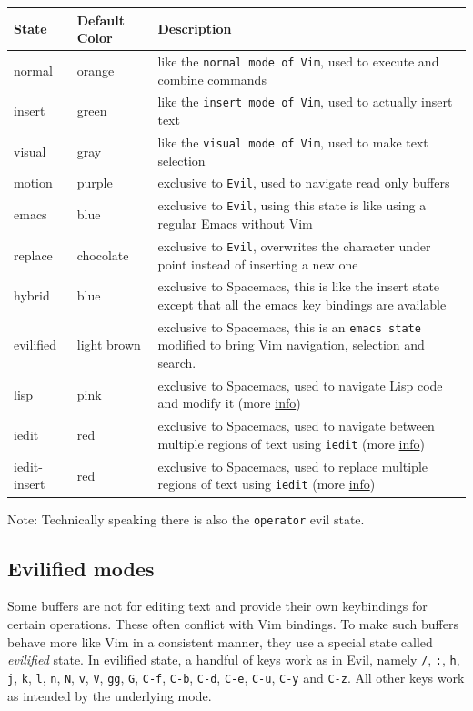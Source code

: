 \documentclass[11pt]{article}
\begin{document}
\begin{center}
\begin{tabular}{lll}
State & Default Color & Description\\
\hline
normal & orange & like the \texttt{normal mode of Vim}, used to execute and combine commands\\
insert & green & like the \texttt{insert mode of Vim}, used to actually insert text\\
visual & gray & like the \texttt{visual mode of Vim}, used to make text selection\\
motion & purple & exclusive to \texttt{Evil}, used to navigate read only buffers\\
emacs & blue & exclusive to \texttt{Evil}, using this state is like using a regular Emacs without Vim\\
replace & chocolate & exclusive to \texttt{Evil}, overwrites the character under point instead of inserting a new one\\
hybrid & blue & exclusive to Spacemacs, this is like the insert state except that all the emacs key bindings are available\\
evilified & light brown & exclusive to Spacemacs, this is an \texttt{emacs state} modified to bring Vim navigation, selection and search.\\
lisp & pink & exclusive to Spacemacs, used to navigate Lisp code and modify it (more \hyperref[sec:org3895a0c]{info})\\
iedit & red & exclusive to Spacemacs, used to navigate between multiple regions of text using \texttt{iedit} (more \hyperref[sec:org32b6bb9]{info})\\
iedit-insert & red & exclusive to Spacemacs, used to replace multiple regions of text using \texttt{iedit} (more \hyperref[sec:org32b6bb9]{info})\\
\end{tabular}
\end{center}

Note: Technically speaking there is also the \texttt{operator} evil state.

\subsection{Evilified modes}
\label{sec:org5a928e3}
Some buffers are not for editing text and provide their own keybindings for
certain operations. These often conflict with Vim bindings. To make such buffers
behave more like Vim in a consistent manner, they use a special state called
\emph{evilified} state. In evilified state, a handful of keys work as in Evil, namely
\texttt{/}, \texttt{:}, \texttt{h}, \texttt{j}, \texttt{k}, \texttt{l}, \texttt{n}, \texttt{N}, \texttt{v}, \texttt{V}, \texttt{gg}, \texttt{G}, \texttt{C-f}, \texttt{C-b},
\texttt{C-d}, \texttt{C-e}, \texttt{C-u}, \texttt{C-y} and \texttt{C-z}. All other keys work as intended by the
underlying mode.
\end{document}
